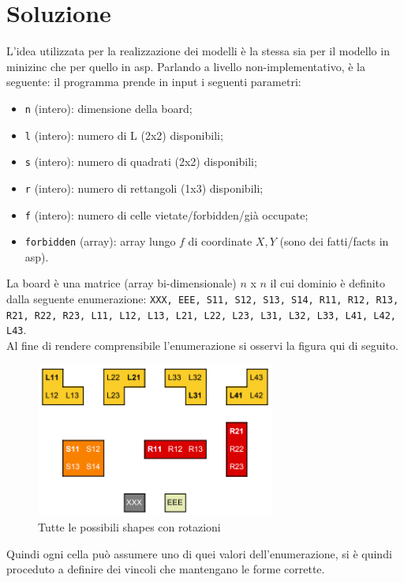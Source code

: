 \documentclass{article}
\begin{document}
\section{Soluzione}
L'idea utilizzata per la realizzazione dei modelli è la stessa sia per il modello in minizinc che per quello in asp. Parlando a livello non-implementativo, è la seguente: il programma prende in input i seguenti parametri:
\begin{itemize}
    \item \texttt{n} (intero): dimensione della board;
    \item \texttt{l} (intero): numero di L (2x2) disponibili;
    \item \texttt{s} (intero): numero di quadrati (2x2) disponibili;
    \item \texttt{r} (intero): numero di rettangoli (1x3) disponibili;
    \item \texttt{f} (intero): numero di celle vietate/forbidden/già occupate;
    \item \texttt{forbidden} (array): array lungo $f$ di coordinate $X,Y$ (sono dei fatti/facts in asp).
\end{itemize}
La board è una matrice (array bi-dimensionale) $n$ x $n$ il cui dominio è definito dalla seguente enumerazione: \texttt{XXX, EEE, S11, S12, S13, S14, R11, R12, R13, R21, R22, R23, L11, L12, L13, L21, L22, L23, L31, L32, L33, L41, L42, L43}.\\
Al fine di rendere comprensibile l'enumerazione si osservi la figura qui di seguito.\\
\begin{figure}[ht!]
    \centering
    \includegraphics[width=0.7\textwidth]{images/shapes}
    \caption{Tutte le possibili shapes con rotazioni}
\end{figure}
Quindi ogni cella può assumere uno di quei valori dell'enumerazione, si è quindi proceduto a definire dei vincoli che mantengano le forme corrette.\\
\end{document}
